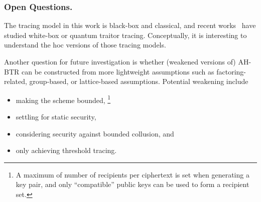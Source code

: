 \subsubsection{Open Questions.}
The tracing model in this work is black-box and classical, and recent works~\cite{C:Zhandry21,TCC:Zhandry20} have studied white-box or quantum traitor tracing.
Conceptually, it is interesting to understand the \ad hoc versions of those tracing models.

Another question for future investigation is whether
(weakened versions of) AH-BTR can be constructed from more lightweight assumptions such as factoring-related, group-based, or lattice-based assumptions.
Potential weakening include
\begin{itemize}
\item making the scheme bounded,%
\footnote{A maximum of number of recipients per ciphertext is set when generating a key pair, and only ``compatible'' public keys can be used to form a recipient set.}
\item settling for static security,
\item considering security against bounded collusion, and
\item only achieving threshold tracing.
\end{itemize}
